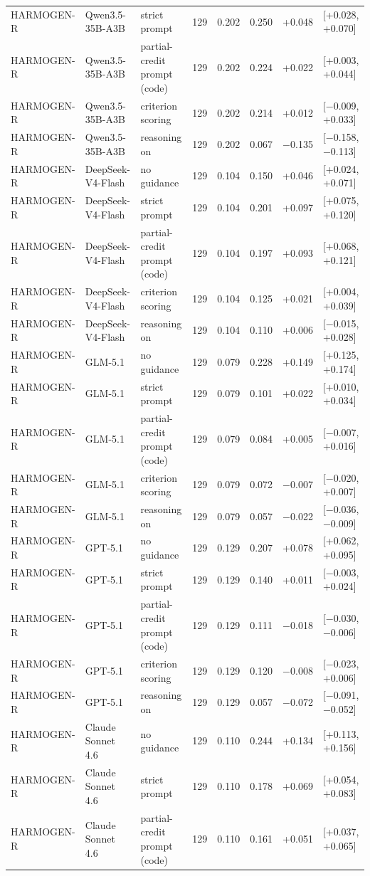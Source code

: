 \documentclass[10pt]{article}
\begin{document}
\begin{longtable}{lllrrrrl}
HARMOGEN-R & Qwen3.5-35B-A3B & strict prompt & 129 & 0.202 & 0.250 & +0.048 & [+0.028, +0.070] \\
HARMOGEN-R & Qwen3.5-35B-A3B & partial-credit prompt (code) & 129 & 0.202 & 0.224 & +0.022 & [+0.003, +0.044] \\
HARMOGEN-R & Qwen3.5-35B-A3B & criterion scoring & 129 & 0.202 & 0.214 & +0.012 & [$-$0.009, +0.033] \\
HARMOGEN-R & Qwen3.5-35B-A3B & reasoning on & 129 & 0.202 & 0.067 & $-$0.135 & [$-$0.158, $-$0.113] \\
HARMOGEN-R & DeepSeek-V4-Flash & no guidance & 129 & 0.104 & 0.150 & +0.046 & [+0.024, +0.071] \\
HARMOGEN-R & DeepSeek-V4-Flash & strict prompt & 129 & 0.104 & 0.201 & +0.097 & [+0.075, +0.120] \\
HARMOGEN-R & DeepSeek-V4-Flash & partial-credit prompt (code) & 129 & 0.104 & 0.197 & +0.093 & [+0.068, +0.121] \\
HARMOGEN-R & DeepSeek-V4-Flash & criterion scoring & 129 & 0.104 & 0.125 & +0.021 & [+0.004, +0.039] \\
HARMOGEN-R & DeepSeek-V4-Flash & reasoning on & 129 & 0.104 & 0.110 & +0.006 & [$-$0.015, +0.028] \\
HARMOGEN-R & GLM-5.1 & no guidance & 129 & 0.079 & 0.228 & +0.149 & [+0.125, +0.174] \\
HARMOGEN-R & GLM-5.1 & strict prompt & 129 & 0.079 & 0.101 & +0.022 & [+0.010, +0.034] \\
HARMOGEN-R & GLM-5.1 & partial-credit prompt (code) & 129 & 0.079 & 0.084 & +0.005 & [$-$0.007, +0.016] \\
HARMOGEN-R & GLM-5.1 & criterion scoring & 129 & 0.079 & 0.072 & $-$0.007 & [$-$0.020, +0.007] \\
HARMOGEN-R & GLM-5.1 & reasoning on & 129 & 0.079 & 0.057 & $-$0.022 & [$-$0.036, $-$0.009] \\
HARMOGEN-R & GPT-5.1 & no guidance & 129 & 0.129 & 0.207 & +0.078 & [+0.062, +0.095] \\
HARMOGEN-R & GPT-5.1 & strict prompt & 129 & 0.129 & 0.140 & +0.011 & [$-$0.003, +0.024] \\
HARMOGEN-R & GPT-5.1 & partial-credit prompt (code) & 129 & 0.129 & 0.111 & $-$0.018 & [$-$0.030, $-$0.006] \\
HARMOGEN-R & GPT-5.1 & criterion scoring & 129 & 0.129 & 0.120 & $-$0.008 & [$-$0.023, +0.006] \\
HARMOGEN-R & GPT-5.1 & reasoning on & 129 & 0.129 & 0.057 & $-$0.072 & [$-$0.091, $-$0.052] \\
HARMOGEN-R & Claude Sonnet 4.6 & no guidance & 129 & 0.110 & 0.244 & +0.134 & [+0.113, +0.156] \\
HARMOGEN-R & Claude Sonnet 4.6 & strict prompt & 129 & 0.110 & 0.178 & +0.069 & [+0.054, +0.083] \\
HARMOGEN-R & Claude Sonnet 4.6 & partial-credit prompt (code) & 129 & 0.110 & 0.161 & +0.051 & [+0.037, +0.065] \\
\hline
\end{longtable}
\endgroup
\end{document}
